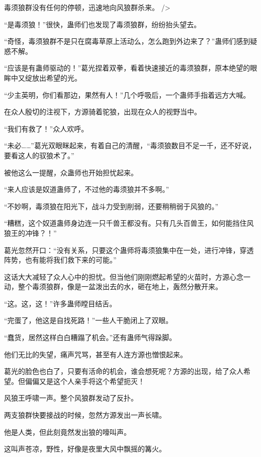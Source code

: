 
\begin{this_body}

毒须狼群没有任何的停顿，迅速地向风狼群杀来。 />

“是毒须狼！”很快，蛊师们也发现了毒须狼群，纷纷抬头望去。

“奇怪，毒须狼群不是只在腐毒草原上活动么，怎么跑到外边来了？”蛊师们感到疑惑不解。

“应该是有蛊师驱动的！”葛光捏着双拳，看着快速接近的毒须狼群，原本绝望的眼眸中又绽放出希望的光。

“少主英明，你们看那边，果然有人！”几个呼吸后，一个蛊师手指着远方大喊。

在众人殷切的注视下，方源骑着驼狼，出现在众人的视野当中。

“我们有救了！”众人欢呼。

“未必……”葛光双眼眯起来，有着自己的清醒，“毒须狼数目不足一千，还不好说，要看这人的驭狼术了。”

被他这么一提醒，众蛊师也开始担忧起来。

“来人应该是奴道蛊师了，不过他的毒须狼并不多啊。”

“不妙啊，毒须狼在阳光下，战斗力受到削弱，还要稍稍弱于风狼的。”

“糟糕，这个奴道蛊师身边连一只千兽王都没有。只有几头百兽王，如何能挡住风狼王的冲锋？！”

葛光忽然开口：“没有关系，只要这个蛊师将毒须狼集中在一处，进行冲锋，穿透阵势，也有能将我们救下来的可能。”

这话大大减轻了众人心中的担忧。但当他们刚刚燃起希望的火苗时，方源心念一动，整个毒须狼群，像是一盆泼出去的水，砸在地上，轰然分散开来。

“这。这，这！”许多蛊师瞠目结舌。

“完蛋了，他这是自找死路！”一些人干脆闭上了双眼。

“蠢货，居然这样白白糟蹋了机会。”还有蛊师气得跺脚。

他们无比的失望，痛声咒骂，甚至有人连方源也憎恨起来。

葛光的脸色也白了，只要有活命的机会，谁会想死呢？方源的出现，给了众人希望。但偏偏又是这个人亲手将这个希望扼灭！

风狼王呼啸一声。整个风狼群发动了反扑。

两支狼群快要接战的时候，忽然方源发出一声长啸。

他是人类，但此刻竟然发出狼的嚎叫声。

这叫声苍凉，野性，好像是夜里大风中飘摇的篝火。


\end{this_body}
